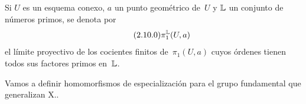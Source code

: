 
\begingroup
\shorthandoff{<>}%
\setcounter{subsection}{9}%
\subsection{}
\label{XIII.2.10}
Si $U$ es un esquema conexo, $a$ un punto geométrico de~$U$ y
$\mathbb L$ un conjunto de números primos, se denota por
\begin{equation*}
\label{eq:XIII.2.10.0}
\tag{2.10.0} \pi_1^{\mathbb L}(U,a)
\end{equation*}
\label{indnot:mi}%
el límite proyectivo de los cocientes finitos de~$\pi_1(U,a)$ cuyos
órdenes tienen todos sus factores primos en~$\mathbb L$.

Vamos a definir homomorfismos de especialización para el grupo
fundamental que generalizan X..


